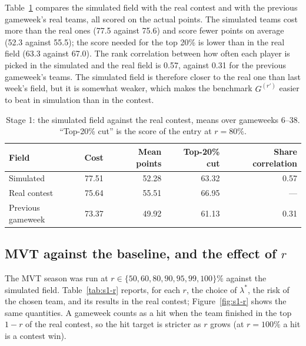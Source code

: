 \documentclass[12pt,oneside,a4paper]{book}
\theoremstyle{definition}
\theoremstyle{remark}
\begin{document}
	Table~\ref{tab:s1-field} compares the simulated field with the real contest and with the
	previous gameweek's real teams, all scored on the actual points. The simulated teams cost more
	than the real ones (77.5 against 75.6) and score fewer points on average (52.3 against 55.5);
	the score needed for the top 20\% is lower than in the real field (63.3 against 67.0). The rank
	correlation between how often each player is picked in the simulated and the real field is
	0.57, against 0.31 for the previous gameweek's teams. The simulated field is therefore closer to
	the real one than last week's field, but it is somewhat weaker, which makes the benchmark
	$G^{(r')}$ easier to beat in simulation than in the contest.

	\begin{table}[ht]
		\centering
		\caption{Stage 1: the simulated field against the real contest, means over gameweeks 6--38.
			``Top-20\% cut'' is the score of the entry at $r=80\%$.}
		\label{tab:s1-field}
		\begin{tabular}{lrrrr}
			\toprule
			Field & Cost & Mean points & Top-20\% cut & Share correlation \\
			\midrule
			Simulated           & 77.51 & 52.28 & 63.32 & 0.57 \\
			Real contest        & 75.64 & 55.51 & 66.95 & --- \\
			Previous gameweek   & 73.37 & 49.92 & 61.13 & 0.31 \\
			\bottomrule
		\end{tabular}
	\end{table}

	\subsection{MVT against the baseline, and the effect of $r$}
	\label{sec:s1-results}

	The MVT season was run at $r\in\{50,60,80,90,95,99,100\}\%$ against the simulated field.
	Table~\ref{tab:s1-r} reports, for each $r$, the choice of $\lambda^*$, the risk of the chosen
	team, and its results in the real contest; Figure~\ref{fig:s1-r} shows the same quantities.
	A gameweek counts as a hit when the team finished in the top $1-r$ of the real contest, so the
	hit target is stricter as $r$ grows (at $r=100\%$ a hit is a contest win).
\end{document}
